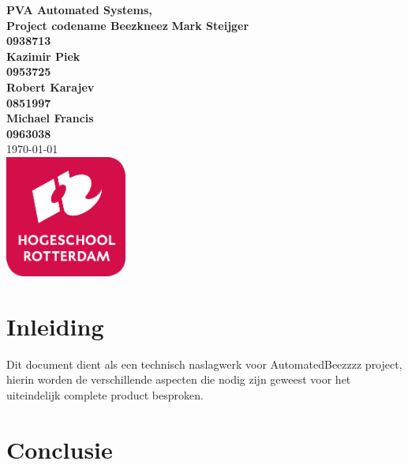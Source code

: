 \documentclass{article}
\begin{document}
\sffamily
\begin{titlepage}
  \centering
    \vfill
    {\bfseries\Huge
      PVA Automated Systems, \\
      Project codename Beezkneez
        \vskip2cm
      }
      {\bfseries\Large
        Mark Steijger\\
      }
      {
        \bfseries\normalsize
        0938713\\
            \vskip1cm
    }
          {\bfseries\Large
        Kazimir Piek\\
      }
      {
        \bfseries\normalsize
        0953725\\
            \vskip1cm
    }      {\bfseries\Large
        Robert Karajev\\
      }
      {
        \bfseries\normalsize
        0851997\\
            \vskip1cm
    }      {\bfseries\Large
        Michael Francis\\
      }
      {
        \bfseries\normalsize
        0963038\\
            \vskip1cm
    }
            \vskip1cm
        \today\\
    \vfill
    \includegraphics[width=4cm]{../IMAGES/logohr.png} %
    \vfill
    \vfill
\end{titlepage}
\newpage
\tableofcontents

\newpage
\section{Inleiding}
Dit document dient als een technisch naslagwerk voor AutomatedBeezzzz project, hierin worden de verschillende aspecten
die nodig zijn geweest voor het uiteindelijk complete product besproken.



% 

% 




\section{Conclusie}


\newpage


\end{document}
